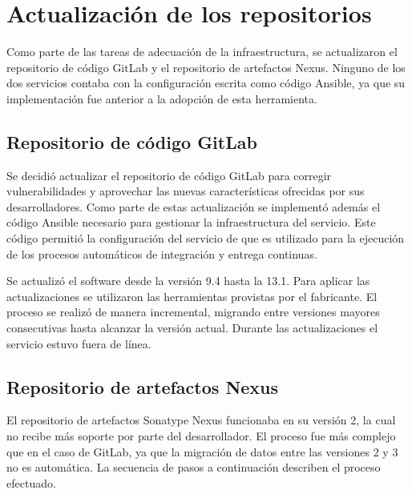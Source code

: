 
\section{Actualización de los repositorios}

Como parte de las tareas de adecuación de la infraestructura, se
actualizaron el repositorio de código GitLab y el repositorio de
artefactos Nexus. Ninguno de los dos servicios contaba con la
configuración escrita como código Ansible, ya que su implementación
fue anterior a la adopción de esta herramienta.

\subsection{Repositorio de código GitLab}

Se decidió actualizar el repositorio de código GitLab para corregir
vulnerabilidades y aprovechar las nuevas características ofrecidas por
sus desarrolladores. Como parte de estas actualización se implementó
además el código Ansible necesario para gestionar la infraestructura
del servicio. Este código permitió la configuración del servicio de
 que es utilizado para la ejecución de los procesos
automáticos de integración y entrega continuas.

Se actualizó el software desde la versión 9.4 hasta la 13.1. Para
aplicar las actualizaciones se utilizaron las herramientas provistas
por el fabricante. El proceso se realizó de manera incremental,
migrando entre versiones mayores consecutivas hasta alcanzar la
versión actual. Durante las actualizaciones el servicio estuvo fuera
de línea.

\subsection{Repositorio de artefactos Nexus}

El repositorio de artefactos Sonatype Nexus funcionaba en su versión
2, la cual no recibe más soporte por parte del desarrollador. El
proceso fue más complejo que en el caso de GitLab, ya que la migración
de datos entre las versiones 2 y 3 no es automática. La secuencia de
pasos a continuación describen el proceso efectuado.

